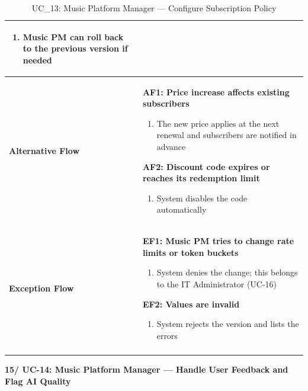 \documentclass[a4paper]{article}
\newlength{\ucLeft}
\begin{document}
\begin{longtable}{|>{\bfseries}p{\ucLeft}|p{\dimexpr\linewidth-\ucLeft-2\tabcolsep-2\arrayrulewidth}|}
\begin{enumerate}[leftmargin=1.5em, nosep, topsep=2pt, partopsep=0pt, parsep=0pt, after=\strut]
    \item Music PM can roll back to the previous version if needed
\end{enumerate}
\\ \hline
Alternative Flow &
\textbf{AF1: Price increase affects existing subscribers}
\begin{enumerate}[leftmargin=1.5em, nosep, topsep=2pt, partopsep=0pt, parsep=0pt, after=\strut]
    \item The new price applies at the next renewal and subscribers are notified in advance
\end{enumerate}
\textbf{AF2: Discount code expires or reaches its redemption limit}
\begin{enumerate}[leftmargin=1.5em, nosep, topsep=2pt, partopsep=0pt, parsep=0pt, after=\strut]
    \item System disables the code automatically
\end{enumerate}
\\ \hline
Exception Flow &
\textbf{EF1: Music PM tries to change rate limits or token buckets}
\begin{enumerate}[leftmargin=1.5em, nosep, topsep=2pt, partopsep=0pt, parsep=0pt, after=\strut]
    \item System denies the change; this belongs to the IT Administrator (UC-16)
\end{enumerate}
\textbf{EF2: Values are invalid}
\begin{enumerate}[leftmargin=1.5em, nosep, topsep=2pt, partopsep=0pt, parsep=0pt, after=\strut]
    \item System rejects the version and lists the errors
\end{enumerate}
\\ \hline
\caption{UC\_13: Music Platform Manager --- Configure Subscription Policy}\label{tab:uc13_policy}
\end{longtable}

\vspace{0.5em}
\noindent\textbf{15/ UC-14: Music Platform Manager --- Handle User Feedback and Flag AI Quality}
\end{document}
